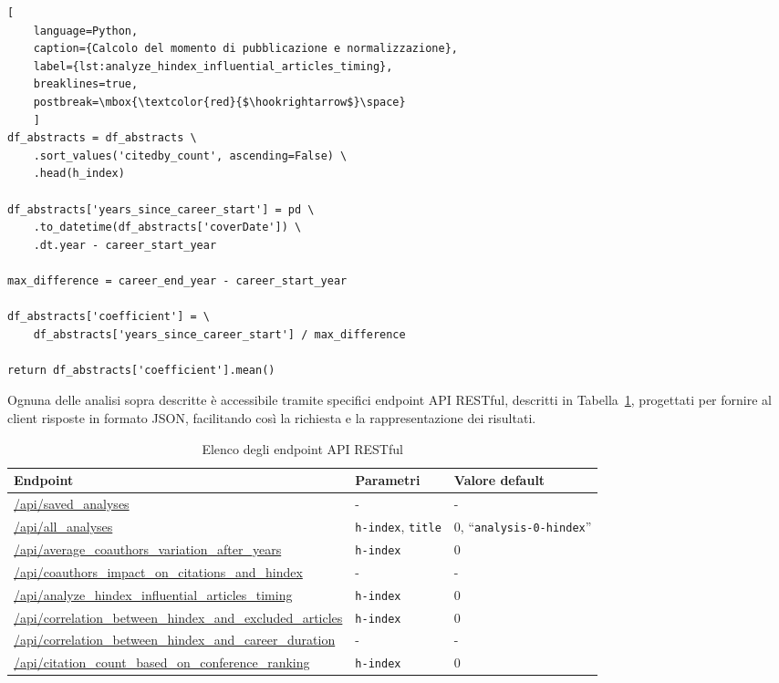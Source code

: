 \begin{lstfloat}
    \begin{lstlisting}[
    language=Python,
    caption={Calcolo del momento di pubblicazione e normalizzazione},
    label={lst:analyze_hindex_influential_articles_timing},
    breaklines=true,
    postbreak=\mbox{\textcolor{red}{$\hookrightarrow$}\space}
    ]
df_abstracts = df_abstracts \
    .sort_values('citedby_count', ascending=False) \
    .head(h_index)

df_abstracts['years_since_career_start'] = pd \
    .to_datetime(df_abstracts['coverDate']) \
    .dt.year - career_start_year

max_difference = career_end_year - career_start_year

df_abstracts['coefficient'] = \
    df_abstracts['years_since_career_start'] / max_difference
    
return df_abstracts['coefficient'].mean()
    \end{lstlisting}
\end{lstfloat}

Ognuna delle analisi sopra descritte è accessibile tramite specifici endpoint API RESTful, descritti in Tabella~\ref{table:api_endpoints}, progettati per fornire al client risposte in formato JSON, facilitando così la richiesta e la rappresentazione dei risultati.

\begin{table}[ht]
    \centering
    \begin{tabularx}{\textwidth}{|X|l|l|}
        \hline
        \textbf{Endpoint} & \textbf{Parametri} & \textbf{Valore default} \\
        \hline
        \url{/api/saved\_analyses} & - & - \\
        \hline
        \url{/api/all\_analyses} & \texttt{h-index}, \texttt{title} & 0, ``\texttt{analysis-0-hindex}'' \\
        \hline
        \url{/api/average\_coauthors\_variation\_after\_years} & \texttt{h-index} & 0 \\
        \hline
        \url{/api/coauthors\_impact\_on\_citations\_and\_hindex} & - & - \\
        \hline
        \url{/api/analyze\_hindex\_influential\_articles\_timing} & \texttt{h-index} & 0 \\
        \hline
        \url{/api/correlation\_between\_hindex\_and\_excluded\_articles} & \texttt{h-index} & 0 \\
        \hline
        \url{/api/correlation_between_hindex_and_career_duration} & - & - \\
        \hline
        \url{/api/citation\_count\_based\_on\_conference\_ranking} & \texttt{h-index} & 0 \\
        \hline
    \end{tabularx}
    \caption{Elenco degli endpoint API RESTful}
    \label{table:api_endpoints}
\end{table}

